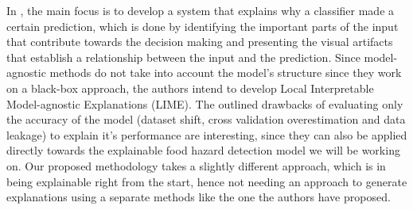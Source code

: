 \documentclass[11pt]{article}
\begin{document}

In \cite{ribeiro-etal-2016-trust}, the main focus is to develop a system that explains why a classifier made a certain prediction, which is done by identifying the important parts of the input that contribute towards the decision making and presenting the visual artifacts that establish a relationship between the input and the prediction. Since model-agnostic methods do not take into account the model's structure since they work on a black-box approach, the authors intend to develop Local Interpretable Model-agnostic Explanations (LIME). The outlined drawbacks of evaluating only the accuracy of the model (dataset shift, cross validation overestimation and data leakage) to explain it's performance are interesting, since they can also be applied directly towards the explainable food hazard detection model we will be working on. Our proposed methodology takes a slightly different approach, which is in being explainable right from the start, hence not needing an approach to generate explanations using a separate methods like the one the authors have proposed.


%






\nocite{*}






%
\newpage

\end{document}
